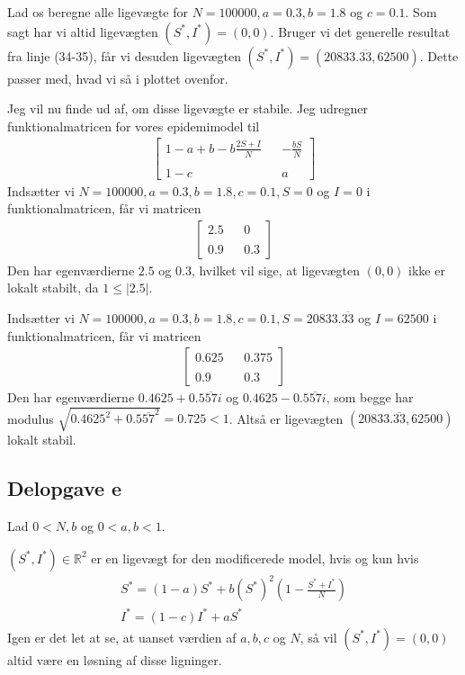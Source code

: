 \documentclass[12pt]{article}
\begin{document}
Lad os beregne alle ligevægte for $N=100000, a=0.3, b=1.8$ og $c=0.1$. Som sagt har vi altid ligevægten $(S^*, I^*)=(0,0)$. Bruger vi det generelle resultat fra linje (34-35), får vi desuden ligevægten $(S^*, I^*)=(20833.\overline{33},62500)$. Dette passer med, hvad vi så i plottet ovenfor.

Jeg vil nu finde ud af, om disse ligevægte er stabile. Jeg udregner funktionalmatricen for vores epidemimodel til
\begin{align}
\begin{bmatrix}
1 - a + b - b\frac{2S + I}{N} && - \frac{bS}{N} \\
\\
1-c && a 
\end{bmatrix}
\end{align}
Indsætter vi $N=100000, a=0.3, b=1.8, c=0.1, S=0$ og $I=0$ i funktionalmatricen, får vi matricen
\begin{align}
\begin{bmatrix}
2.5 && 0 \\
\\
0.9 && 0.3 
\end{bmatrix}
\end{align}
Den har egenværdierne $2.5$ og $0.3$, hvilket vil sige, at ligevægten $(0,0)$ ikke er lokalt stabilt, da $1\leq |2.5|$.

Indsætter vi $N=100000, a=0.3, b=1.8, c=0.1, S=20833.\overline{33}$ og $I=62500$ i funktionalmatricen, får vi matricen
\begin{align}
\begin{bmatrix}
0.625 && 0.375 \\
\\
0.9 && 0.3 
\end{bmatrix}
\end{align}
Den har egenværdierne $0.4625 + 0.5\overline{57}i$ og $0.4625 - 0.5\overline{57}i$, som begge har modulus $\sqrt{0.4625^2 + 0.5\overline{57}^2}=0.725<1$. Altså er ligevægten $(20833.\overline{33}, 62500)$ lokalt stabil.

\subsection{Delopgave e}

Lad $0 < N, b$ og $0 < a,b < 1$. 

$(S^*,I^*)\in \mathbb{R}^2$ er en ligevægt for den modificerede model, hvis og kun hvis
\begin{align}
S^* = (1-a)S^* + b(S^*)^2\left(1 - \frac{S^* + I^*}{N} \right)\\
I^* = (1-c)I^* + aS^*
\end{align}
Igen er det let at se, at uanset værdien af $a, b, c$ og $N$, så vil $(S^*,I^*)=(0,0)$ altid være en løsning af disse ligninger. 
\end{document}
